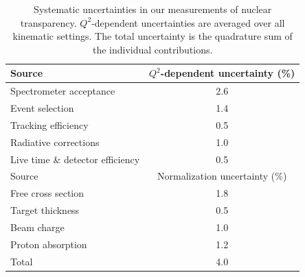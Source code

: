\begin{table}[htb!]
    \caption{
        Systematic uncertainties in our measurements of nuclear
        transparency.
        $Q^2$-dependent uncertainties are averaged over all kinematic settings.
        The total uncertainty is the quadrature sum of the individual
        contributions.
    }
    \label{tab:systematic_uncertainty}
    \centering
    \begin{tabular}{lc}
        \hline
        \hline
        Source                            & $Q^2$-dependent uncertainty (\%) \\
        \hline
        Spectrometer acceptance           & 2.6                              \\
        Event selection                   & 1.4                              \\
        Tracking efficiency               & 0.5                              \\
        Radiative corrections             & 1.0                              \\
        Live time \& detector efficiency  & 0.5                              \\
        \hline
        \hline
        Source                            & Normalization uncertainty (\%)   \\
        \hline
        Free cross section                & 1.8                              \\
        Target thickness                  & 0.5                              \\
        Beam charge                       & 1.0                              \\
        Proton absorption                 & 1.2                              \\
        \hline
        \hline
        Total                             & 4.0                              \\
    \end{tabular}
\end{table}
